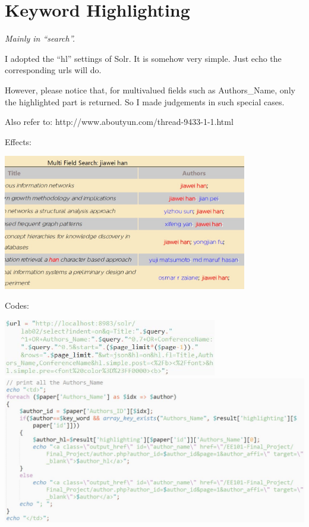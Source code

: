 \documentclass[10pt,twoside,a4paper,titlepage]{article}
\begin{document}
	\section{Keyword Highlighting}
		\emph{Mainly in “search”.}\newline\par
		I adopted the “hl” settings of Solr. It is somehow very simple. Just echo the corresponding urls will do.\par
		However, please notice that, for multivalued fields such as Authors\_Name, only the highlighted part is returned. So I made judgements in such special cases.\par
		Also refer to: http://www.aboutyun.com/thread-9433-1-1.html\newline\par
		Effects:\newline\par
		\includegraphics[width=0.8\textwidth]{gzl/02.png}\newline\par
		Codes:\newline\par
		\includegraphics[width=0.7\textwidth]{gzl/02.jpg}
			\newpage
		\includegraphics[width=1\textwidth]{gzl/03.jpg}\par
\end{document}

